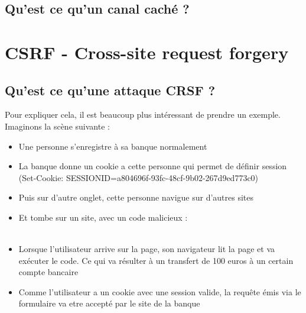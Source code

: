 \documentclass{article}
\begin{document}
\subsection{Qu'est ce qu'un canal caché ?}

\newpage
\section{CSRF - Cross-site request forgery}
\subsection{Qu'est ce qu'une attaque CRSF ?}
Pour expliquer cela, il est beaucoup plus intéressant de prendre un exemple. Imaginons la scène suivante :\\
\begin{itemize}
\item Une personne s'enregistre à sa banque normalement\\
\item La banque donne un cookie a cette personne qui permet de définir session\\
 (Set-Cookie: SESSIONID=a804696f-93fc-48cf-9b02-267d9ed773c0)\\
\item Puis sur d'autre onglet, cette personne navigue sur d'autres sites\\
\item Et tombe sur un site, avec un code malicieux :\\
\\
\item Lorsque l'utilisateur arrive sur la page, son navigateur lit la page et va exécuter le code. Ce qui va résulter à un transfert de 100 euros à un certain compte bancaire\\
\item Comme l'utilisateur a un cookie avec une session valide, la requête émis via le formulaire va etre accepté par le site de la banque
\end{itemize}
\end{document}
